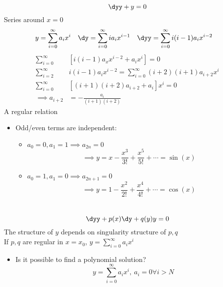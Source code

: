 \documentclass[Maths.tex]{subfiles}
\begin{document}
\begin{example}
\begin{equation}
    \dyy + y = 0
\end{equation}
Series around $x=0$
\begin{align}
    y &= \sum_{i=0}^\infty a_ix^i & \dy &= \sum_{i=0}^\infty ia_ix^{i-1} & \dyy &= \sum_{i=0}^\infty i(i-1)a_ix^{i-2}
\end{align}
\begin{align}
    \sum_{i=0}^\infty &\left[i(i-1)a_xx^{i-2} + a_ix^i\right] = 0 \\
    \sum_{i=2}^\infty &i(i-1)a_ix^{i-2} = \sum_{i=0}^\infty (i+2)(i+1)a_{i+2}x^i \\
    \sum_{i=0}^\infty &\left[(i+1)(i+2)a_{i+2}+ a_i\right]x^i = 0 \\
    \implies a_{i+2} &= -\frac{a_i}{(i+1)(i+2)}
\end{align}
A regular relation
\begin{itemize}
    \item Odd/even terms are independent:
    \begin{itemize}
        \item $a_0 = 0, a_1 = 1 \implies a_{2n} = 0$
        \begin{equation}
            \implies y = x - \frac{x^3}{3!} + \frac{x^5}{5!} + \cdots = \sin(x)
        \end{equation}
        \item $a_0 = 1, a_1 = 0 \implies a_{2n+1} = 0$
        \begin{equation}
            \implies y = 1 - \frac{x^2}{2!} + \frac{x^4}{4!} + \cdots = \cos(x)
        \end{equation}
    \end{itemize}
\end{itemize}
\end{example}

\chapter{}
\begin{equation}
    \dyy + p(x)\dy + q(y)y = 0
\end{equation}
The structure of $y$ depends on singularity structure of $p,q$ \\
If $p,q$ are regular in $x=x_0$, $y = \sum_{i=0}^\infty a_ix^i$

\begin{itemize}
    \item Is it possible to find a polynomial solution?
    \begin{equation}
        y = \sum_{i=0}^\infty a_ix^i,~ a_i = 0 \forall i > N
    \end{equation}
\end{itemize}
\end{document}
